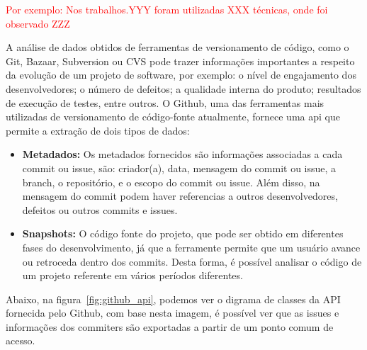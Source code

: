


\textcolor{red}{Por exemplo: Nos trabalhos.YYY foram utilizadas XXX técnicas, onde foi observado ZZZ}


A análise de dados obtidos de ferramentas de versionamento de código, como o Git, Bazaar, Subversion ou CVS pode trazer informações importantes a respeito da evolução de um projeto de software, por exemplo: o nível de engajamento dos desenvolvedores; o número de defeitos; a qualidade interna do produto; resultados de execução de testes, entre outros\cite{artAndScience}. O Github, uma das ferramentas mais utilizadas de versionamento de código-fonte atualmente, fornece uma api que permite a extração de dois tipos de dados: 


\begin{itemize}
\item \textbf{Metadados:} Os metadados fornecidos são informações associadas a cada commit ou issue, são: criador(a), data, mensagem do commit ou issue, a branch, o repositório, e o escopo do commit ou issue. Além disso, na mensagem do commit podem haver referencias a outros
desenvolvedores, defeitos ou outros commits e issues.
\item \textbf{Snapshots:} O código fonte do projeto, que pode ser obtido em diferentes fases do desenvolvimento, já que a ferramente permite que um usuário avance ou retroceda dentro dos commits. Desta forma, é possível analisar o código de um projeto referente em vários períodos diferentes.
\end{itemize}

Abaixo, na figura~\ref{fig:github_api}, podemos ver o digrama de classes da API fornecida pelo
Github, com base nesta imagem, é possível ver que as issues e informações dos commiters
são exportadas a partir de um ponto comum de acesso.

